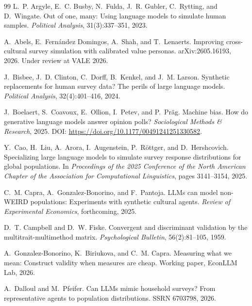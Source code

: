 \documentclass[10pt,letterpaper]{article}
\begin{document}
\begin{thebibliography}{99}
L.~P. Argyle, E.~C. Busby, N.~Fulda, J.~R. Gubler, C.~Rytting, and D.~Wingate.
\newblock Out of one, many: Using language models to simulate human samples.
\newblock \emph{Political Analysis}, 31(3):337--351, 2023.

A.~Abels, E.~Fern\'andez Domingos, A.~Shah, and T.~Lenaerts.
\newblock Improving cross-cultural survey simulation with calibrated value personas.
\newblock arXiv:2605.16193, 2026. Under review at VALE 2026.

J.~Bisbee, J.~D. Clinton, C.~Dorff, B.~Kenkel, and J.~M. Larson.
\newblock Synthetic replacements for human survey data? The perils of large language models.
\newblock \emph{Political Analysis}, 32(4):401--416, 2024.

J.~Boelaert, S.~Coavoux, E.~Ollion, I.~Petev, and P.~Pr\"ag.
\newblock Machine bias. How do generative language models answer opinion polls?
\newblock \emph{Sociological Methods \& Research}, 2025.
\newblock DOI: \url{https://doi.org/10.1177/00491241251330582}.

Y.~Cao, H.~Liu, A.~Arora, I.~Augenstein, P.~R\"ottger, and D.~Hershcovich.
\newblock Specializing large language models to simulate survey response distributions for global populations.
\newblock In \emph{Proceedings of the 2025 Conference of the North American Chapter of the Association for Computational Linguistics}, pages 3141--3154, 2025.

C.~M. Capra, A.~Gonzalez-Bonorino, and F.~Pantoja.
\newblock LLMs can model non-WEIRD populations: Experiments with synthetic cultural agents.
\newblock \emph{Review of Experimental Economics}, forthcoming, 2025.

D.~T. Campbell and D.~W. Fiske.
\newblock Convergent and discriminant validation by the multitrait-multimethod matrix.
\newblock \emph{Psychological Bulletin}, 56(2):81--105, 1959.

A.~Gonzalez-Bonorino, K.~Biriukova, and C.~M. Capra.
\newblock Measuring what we mean: Construct validity when measures are cheap.
\newblock Working paper, EconLLM Lab, 2026.

A.~Dalloul and M.~Pfeifer.
\newblock Can LLMs mimic household surveys? From representative agents to population distributions.
\newblock SSRN 6703798, 2026.


\end{thebibliography}
\end{document}
